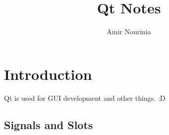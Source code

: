 \documentclass[11pt,twoside,a4paper]{report}
\title{Qt Notes}
\author{Amir Nourinia}
\begin{document}
\maketitle
\tableofcontents

\chapter{Introduction}
Qt is used for GUI development and other things. :D

\section{Signals and Slots}
\end{document}

